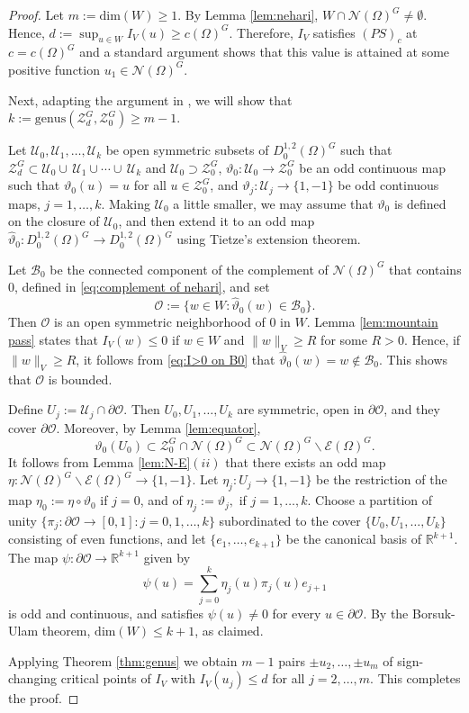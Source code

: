 \documentclass[10pt,letterpaper]{article}
\numberwithin{equation}{section}
\def\r{\mathbb{R}}
\def\o{\Omega}
\def\cB{\mathcal{B}}
\def\cE{\mathcal{E}}
\def\cN{\mathcal{N}}
\def\cO{\mathcal{O}}
\def\cU{\mathcal{U}}
\def\cZ{\mathcal{Z}}
\def\what{\widehat}
\def\dim{\mathrm{dim}}
\def\gen{\mathrm{genus}}
\begin{document}
\begin{proof}
Let $m:=\dim(W)\geq 1$. By Lemma \ref{lem:nehari}, $W\cap\cN(\o)^G\neq\emptyset$. Hence, $d:=\sup_{u\in W}I_V(u)\geq c(\o)^G$. Therefore, $I_V$ satisfies $(PS)_c$ at $c=c(\o)^G$ and a standard argument shows that this value is attained at some positive function $u_1\in\cN(\o)^G$.

Next, adapting the argument in \cite[Theorem 3.7]{cp}, we will show that $k:=\gen(\cZ_d^G,\cZ_0^G)\geq m-1$. 

Let $\cU_0,\cU_1,\ldots,\cU_k$ be open symmetric subsets of $D^{1,2}_0(\o)^G$ such that $\cZ^G_d\subset\cU_0\cup\,\cU_1\cup\cdots\cup\,\cU_k$ and $\cU_0 \supset \cZ^G_0$, $\vartheta_0: \cU_0\to\cZ^G_0$ be an odd continuous map such that $\vartheta_0(u)=u$ for all $u \in \cZ^G_0$, and $\vartheta_j: \cU_j \to \{1,-1\}$ be odd continuous maps, $j =1,\ldots,k$. Making $\cU_0$ a little smaller, we may assume that $\vartheta_0$ is defined on the closure of $\cU_0$, and then extend it to an odd map $\what{\vartheta}_0: D^{1,2}_0(\o)^G\to D^{1,2}_0(\o)^G$ using Tietze's extension theorem.

Let $\cB_0$ be the connected component of the complement of $\cN(\o)^G$ that contains $0$, defined in \eqref{eq:complement of nehari}, and set
$$\cO:= \{w\in W:\what{\vartheta}_0(w)\in\cB_0\}.$$
Then $\cO$ is an open symmetric neighborhood of $0$ in $W$. Lemma \ref{lem:mountain pass} states that $I_V(w)\leq 0$ if $w\in W$ and $\|w\|_V\geq R$ for some $R>0$. Hence, if $\|w\|_V\geq R$, it follows from \eqref{eq:I>0 on B0} that $\what{\vartheta}_0(w)=w\notin \cB_0$. This shows that  $\cO$ is bounded. 

Define $U_j := \cU_j \cap \partial \cO$. Then $U_0, U_1, \ldots ,U_k$ are symmetric, open in $ \partial \cO$, and they cover $\partial \cO$. Moreover, by Lemma \ref{lem:equator},
$$\vartheta_0(U_0) \subset \cZ^G_0 \cap \cN(\o)^G \subset \cN(\o)^G \smallsetminus \cE(\o)^G.$$
It follows from Lemma \ref{lem:N-E}$(ii)$ that there exists an odd map $\eta : \cN(\o)^G \smallsetminus \cE(\o)^G \to\{1,-1\}$. Let $\eta_j:U_j \to\{1,-1\}$ be the restriction of the map $\eta_0 := \eta \circ \vartheta_0$ if $j=0$, and of $\eta_j := \vartheta_j,$ if $j= 1, \ldots,k$. Choose a partition of unity $\{\pi_j:\partial \mathcal{O} \to [0,1]: j =0,1, \ldots,k\}$ subordinated to the cover $\{U_0, U_1, \ldots,U_k \}$ consisting of even functions, and let $\{ e_1, \ldots, e_{k+1} \}$ be the canonical basis of $\r^{k+1}$. The map $\psi: \partial \mathcal{O} \rightarrow \r^{k+1}$ given by
$$\psi(u) = \sum_{j=0}^{k} \eta_j(u) \pi_j(u) e_{j+1}$$
is odd and continuous, and satisfies $\psi(u) \neq 0$ for every $u \in \partial \mathcal{O}$. By the Borsuk-Ulam theorem, $\dim(W) \leq k+1$, as claimed.
        
Applying Theorem \ref{thm:genus} we obtain $m-1$ pairs $\pm u_2,\ldots,\pm u_m$ of sign-changing critical points of $I_V$ with $I_V(u_j)\leq d$ for all $j=2,\ldots,m$. This completes the proof.
\end{proof}
\end{document}
